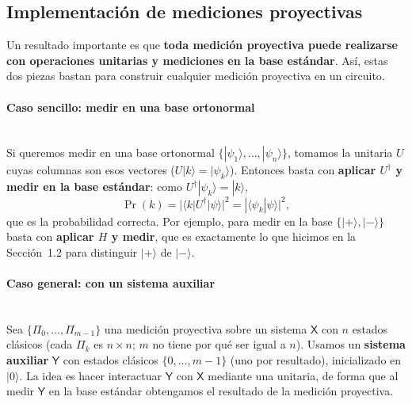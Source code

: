 \documentclass[11pt, a4paper, twoside, openright]{report}
\begin{document}
\subsection{Implementación de mediciones proyectivas}

\noindent Un resultado importante es que \textbf{toda medición proyectiva puede realizarse con operaciones unitarias y mediciones en la base estándar}. Así, estas dos piezas bastan para construir cualquier medición proyectiva en un circuito.

\paragraph{Caso sencillo: medir en una base ortonormal}\mbox{}\\

\noindent Si queremos medir en una base ortonormal $\{|\psi_1\rangle,\dots,|\psi_n\rangle\}$, tomamos la unitaria $U$ cuyas columnas son esos vectores ($U|k\rangle = |\psi_k\rangle$). Entonces basta con \textbf{aplicar $U^\dagger$ y medir en la base estándar}: como $U^\dagger|\psi_k\rangle = |k\rangle$,
\[ \Pr(k) = |\langle k|U^\dagger|\psi\rangle|^2 = |\langle\psi_k|\psi\rangle|^2, \]
que es la probabilidad correcta. Por ejemplo, para medir en la base $\{|+\rangle,|-\rangle\}$ basta con \textbf{aplicar $H$ y medir}, que es exactamente lo que hicimos en la Sección~1.2 para distinguir $|+\rangle$ de $|-\rangle$.

\paragraph{Caso general: con un sistema auxiliar}\mbox{}\\

\noindent Sea $\{\Pi_0,\dots,\Pi_{m-1}\}$ una medición proyectiva sobre un sistema $\mathsf{X}$ con $n$ estados clásicos (cada $\Pi_k$ es $n\times n$; $m$ no tiene por qué ser igual a $n$). Usamos un \textbf{sistema auxiliar} $\mathsf{Y}$ con estados clásicos $\{0,\dots,m-1\}$ (uno por resultado), inicializado en $|0\rangle$. La idea es hacer interactuar $\mathsf{Y}$ con $\mathsf{X}$ mediante una unitaria, de forma que al medir $\mathsf{Y}$ en la base estándar obtengamos el resultado de la medición proyectiva.
\end{document}
